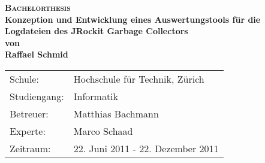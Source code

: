 \begin{titlepage}
\begin{center}
\textsc{\Huge \bf Bachelorthesis}\\[0.4cm]
\LARGE \textbf{Konzeption und Entwicklung eines Auswertungstools für die Logdateien des JRockit Garbage Collectors}\\[1.0cm]
\large \textbf{von}\\[0.5cm]
\large \textbf{Raffael Schmid}\\[4cm]
\vspace{7cm}

\end{center}

\begin{tabular}[ht]{ll}
  Schule: & Hochschule für Technik, Zürich\\
  Studiengang: & Informatik \\
  Betreuer: & Matthias Bachmann\\
  Experte: & Marco Schaad \\
  Zeitraum: & 22. Juni 2011 - 22. Dezember 2011
\end{tabular}
\end{titlepage}
